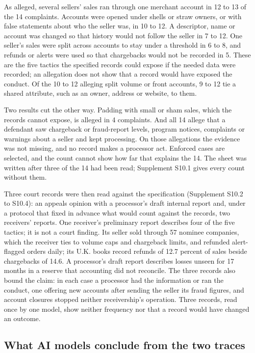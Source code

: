 \documentclass[acmlarge,review,anonymous,nonacm]{acmart}
\begin{document}
As alleged, several sellers' sales ran through one merchant account in
12 to 13 of the 14 complaints. Accounts were opened under shells or
straw owners, or with false statements about who the seller was, in 10
to 12. A descriptor, name or account was changed so that history would
not follow the seller in 7 to 12. One seller's sales were split across
accounts to stay under a threshold in 6 to 8, and refunds or alerts were
used so that chargebacks would not be recorded in 5. These are the five
tactics the specified records could expose if the needed data were
recorded; an allegation does not show that a record would have exposed
the conduct. Of the 10 to 12 alleging split volume or front accounts, 9
to 12 tie a shared attribute, such as an owner, address or website, to
them.

Two results cut the other way. Padding with small or sham sales, which
the records cannot expose, is alleged in 4 complaints. And all 14 allege
that a defendant saw chargeback or fraud-report levels, program notices,
complaints or warnings about a seller and kept processing. On those
allegations the evidence was not missing, and no record makes a
processor act. Enforced cases are selected, and the count cannot show
how far that explains the 14. The sheet was written after three of the
14 had been read; Supplement S10.1 gives every count without them.

Three court records were then read against the specification (Supplement
S10.2 to S10.4): an appeals opinion with a processor's draft internal
report and, under a protocol that fixed in advance what would count
against the records, two receivers' reports. One receiver's preliminary
report describes four of the five tactics; it is not a court finding.
Its seller sold through 57 nominee companies, which the receiver ties to
volume caps and chargeback limits, and refunded alert-flagged orders
daily; its U.K. books record refunds of 12.7 percent of sales beside
chargebacks of 14.6. A processor's draft report describes losses unseen
for 17 months in a reserve that accounting did not reconcile. The three
records also bound the claim: in each case a processor had the
information or ran the conduct, one offering new accounts after sending
the seller its fraud figures, and account closures stopped neither
receivership's operation. Three records, read once by one model, show
neither frequency nor that a record would have changed an outcome.

\hypertarget{what-ai-models-conclude-from-the-two-traces}{%
\subsection{What AI models conclude from the two
traces}\label{what-ai-models-conclude-from-the-two-traces}}
\end{document}

